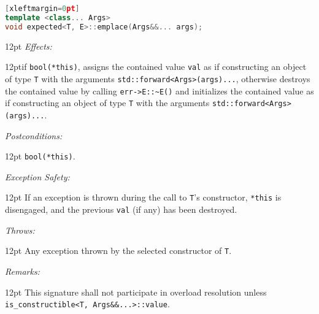\documentclass[a4paper,10pt]{article}
\newcommand{\cpp}[1]{\lstinline{#1}}
\newcommand{\wordingItem}[1]{\noindent\textit{#1:}}
\newenvironment{wordingTextItem}[1]{\wordingItem{#1}\vspace{2pt}\noindent\begin{adjustwidth}{12pt}{}}{\vspace{2pt}\end{adjustwidth}}
\newenvironment{wordingPara}{\begin{adjustwidth}{12pt}{}}{\end{adjustwidth}}
\begin{document}
\begin{lstlisting}[language=C++][xleftmargin=0pt]
template <class... Args>
void expected<T, E>::emplace(Args&&... args); 
\end{lstlisting}
\begin{wordingPara}
\begin{wordingTextItem}{Effects}if \cpp{bool(*this)}, assigns the contained value \cpp{val} as if constructing an object of type \cpp{T} with the arguments \cpp{std::forward<Args>(args)...}, otherwise destroys the contained value by calling \cpp{err->E::~E()} and  initializes the contained value as if constructing an object of type \cpp{T} with the arguments \cpp{std::forward<Args>(args)...}.
\end{wordingTextItem}
\begin{wordingTextItem}{Postconditions}
\cpp{bool(*this)}.
\end{wordingTextItem}
\begin{wordingTextItem}{Exception Safety}
If an exception is thrown during the call to \cpp{T}'s constructor, \cpp{*this} is disengaged, and the previous \cpp{val} (if any) has been destroyed.
\end{wordingTextItem}
\begin{wordingTextItem}{Throws}
Any exception thrown by the selected constructor of \cpp{T}.
\end{wordingTextItem}
\begin{wordingTextItem}{Remarks}
This signature shall not participate in overload resolution unless\\
\cpp{is_constructible<T, Args&&...>::value}.
\end{wordingTextItem}
\end{wordingPara}
\end{document}
